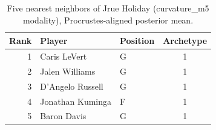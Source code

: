 \begin{table}[htbp]
  \centering\small
  \begin{tabular}{rllc}
    \toprule
    Rank & Player & Position & Archetype \\
    \midrule
    1 & Caris LeVert & G & 1 \\
    2 & Jalen Williams & G & 1 \\
    3 & D'Angelo Russell & G & 1 \\
    4 & Jonathan Kuminga & F & 1 \\
    5 & Baron Davis & G & 1 \\
    \bottomrule
  \end{tabular}
  \caption{Five nearest neighbors of Jrue Holiday (curvature_m5 modality), Procrustes-aligned posterior mean.}
  \label{tab:Jrue_Holiday_neighbors_curvature_m5}
\end{table}

